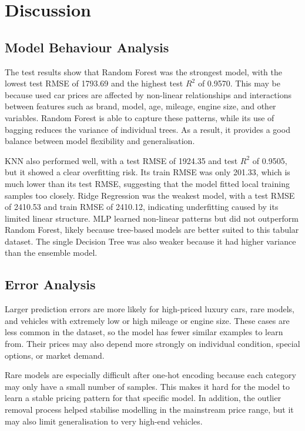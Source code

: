 \section{Discussion}
\label{sec:discussion}

\subsection{Model Behaviour Analysis}

The test results show that Random Forest was the strongest model, with the lowest test RMSE of 1793.69 and the highest test $R^2$ of 0.9570.
This may be because used car prices are affected by non-linear relationships and interactions between features such as brand, model, age, mileage, engine size, and other variables.
Random Forest is able to capture these patterns, while its use of bagging reduces the variance of individual trees.
As a result, it provides a good balance between model flexibility and generalisation.

KNN also performed well, with a test RMSE of 1924.35 and test $R^2$ of 0.9505, but it showed a clear overfitting risk.
Its train RMSE was only 201.33, which is much lower than its test RMSE, suggesting that the model fitted local training samples too closely.
Ridge Regression was the weakest model, with a test RMSE of 2410.53 and train RMSE of 2410.12, indicating underfitting caused by its limited linear structure.
MLP learned non-linear patterns but did not outperform Random Forest, likely because tree-based models are better suited to this tabular dataset.
The single Decision Tree was also weaker because it had higher variance than the ensemble model.

\subsection{Error Analysis}

Larger prediction errors are more likely for high-priced luxury cars, rare models, and vehicles with extremely low or high mileage or engine size.
These cases are less common in the dataset, so the model has fewer similar examples to learn from.
Their prices may also depend more strongly on individual condition, special options, or market demand.

Rare models are especially difficult after one-hot encoding because each category may only have a small number of samples.
This makes it hard for the model to learn a stable pricing pattern for that specific model.
In addition, the outlier removal process helped stabilise modelling in the mainstream price range, but it may also limit generalisation to very high-end vehicles.

